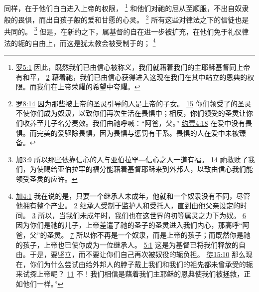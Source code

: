 \documentclass[12pt, a4paper, oneside]{ctexart}
\begin{document}
	同样，在于他们白白进入上帝的权限，
	\footnote {
		\href{https://biblehub.com/romans/5-1.htm}{罗5:1} 因此，既然我们已由信心被称义，我们就藉着我们的主耶稣基督同上帝有和平，
		\href{https://biblehub.com/romans/5-2.htm}{2} 藉着祂，我们已由信心获得进入这现在我们在其中站立的恩典的权限。而我们在上帝荣耀的希望中夸耀。

	}
	和他们对祂的屈从至顺服，不出自奴隶般的畏惧，而出自孩子般的爱和甘愿的心灵。
	\footnote {
		\href{https://biblehub.com/romans/8-14.htm}{罗8:14} 因为那些被上帝的圣灵引导的人是上帝的子女。
		\href{https://biblehub.com/romans/8-15.htm}{15} 你们领受了的圣灵不使你们成为奴隶，以致你们再次生活在畏惧中；相反，你们领受的圣灵让你们收养至儿子名分奏效。我们由祂呼喊：“阿爸，父。”
		\href{https://biblehub.com/1_john/4-18.htm}{约壹4:18} 在爱中没有畏惧。而完美的爱驱除畏惧，因为畏惧与惩罚有干系。畏惧的人在爱中未被臻备。
	}
	所有这些对律法之下的信徒也是共同的。
	\footnote {
		\href{https://biblehub.com/galatians/3-9.htm}{加3:9} 所以那些依靠信心的人与亚伯拉罕---信心之人一道有福。
		\href{https://biblehub.com/galatians/3-14.htm}{14} 祂救赎了我们，为使赐给亚伯拉罕的福分能藉着基督耶稣来到外邦人，以致由信心我们能领受圣灵的应许。
	}
	但是，在新约之下，属基督的自在进一步被扩充，在他们免于礼仪律法的轭的自由上，而这是犹太教会被受制于的；
	\footnote {
		\href{https://biblehub.com/galatians/4-1.htm}{加4:1} 我在说的是，只要一个继承人未成年，他就和一个奴隶没有不同，尽管他拥有整个产业。
		\href{https://biblehub.com/galatians/4-2.htm}{2} 继承人受制于监护人和受托人，直到由他父亲设定的时间。
		\href{https://biblehub.com/galatians/4-3.htm}{3} 所以，当我们未成年时，我们也在这世界的初等属灵之力下为奴。
		\href{https://biblehub.com/galatians/4-6.htm}{6} 因为你们是祂的儿子，上帝差遣了祂的圣子的圣灵进入我们内心，那高呼“阿爸，父”的圣灵。
		\href{https://biblehub.com/galatians/4-7.htm}{7} 所以你不再是一个奴隶，而是上帝的孩子；而既然你是祂的孩子，上帝也已使你成为一位继承人。
		\href{https://biblehub.com/galatians/5-1.htm}{5:1} 这是为基督已将我们释放的自由。于是，要坚立，而不要让你们自己再次被奴役的轭负担。
		\href{https://biblehub.com/acts/15-10.htm}{徒15:10} 那么现在，你们为什么尝试由给外邦人的脖子戴上我们和我们的祖先都未曾承受的轭来试探上帝呢？
		\href{https://biblehub.com/acts/15-11.htm}{11} 不！我们相信是藉着我们主耶稣的恩典使我们被拯救，正如他们一样。”
	}
\end{document}
